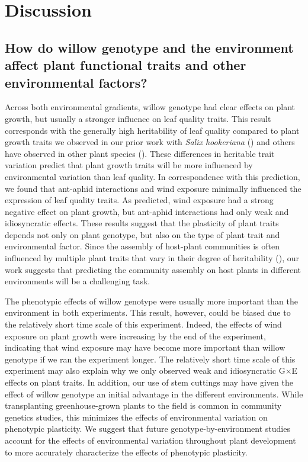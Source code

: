 \documentclass[11pt]{article}
\begin{document}
\section*{Discussion}

\subsection*{How do willow genotype and the environment affect plant functional traits and other environmental factors?}

Across both environmental gradients, willow genotype had clear effects on plant growth, but usually a stronger influence on leaf quality traits. This result corresponds with the generally high heritability of leaf quality compared to plant growth traits we observed in our prior work with \textit{Salix hookeriana} (\citealt{Barbour_2015}) and others have observed in other plant species (\citealt{johnson2009heritability,geber2003inheritance}). These differences in heritable trait variation predict that plant growth traits will be more influenced by environmental variation than leaf quality. In correspondence with this prediction, we found that ant-aphid interactions and wind exposure minimally influenced the expression of leaf quality traits. As predicted, wind exposure had a strong negative effect on plant growth, but ant-aphid interactions had only weak and idiosyncratic effects. These results suggest that the plasticity of plant traits depends not only on plant genotype, but also on the type of plant trait and environmental factor. Since the assembly of host-plant communities is often influenced by multiple plant traits that vary in their degree of heritability (\citealt{Barbour_2015,agrawal2005natural}), our work suggests that predicting the community assembly on host plants in different environments will be a challenging task.

The phenotypic effects of willow genotype were usually more important than the environment in both experiments. This result, however, could be biased due to the relatively short time scale of this experiment. Indeed, the effects of wind exposure on plant growth were increasing by the end of the experiment, indicating that wind exposure may have become more important than willow genotype if we ran the experiment longer. The relatively short time scale of this experiment may also explain why we only observed weak and idiosyncratic G$\times$E effects on plant traits. In addition, our use of stem cuttings may have given the effect of willow genotype an initial advantage in the different environments. While transplanting greenhouse-grown plants to the field is common in community genetics studies, this minimizes the effects of environmental variation on phenotypic plasticity. We suggest that future genotype-by-environment studies account for the effects of environmental variation throughout plant development to more accurately characterize the effects of phenotypic plasticity. 
\end{document}
